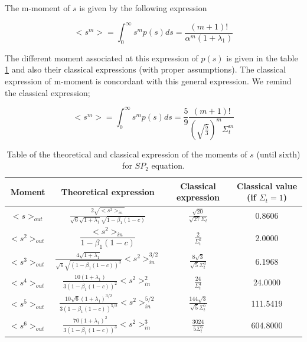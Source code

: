 \documentclass[a4paper, 12pt]{report}
\newcommand{\bl}{\big<}
\newcommand{\bg}{\big>}
\begin{document}
The m-moment of $s$ is given by the following expression

\begin{equation}
\bl s^m \bg = \int_0^\infty s^m p(s) ds = \frac{(m+1)!}{\alpha^m (1+\lambda_1)}
\end{equation}

The different moment associated at this expression of $p(s)$ is given in the table \ref{momentnsp2} and also their classical expressions (with proper assumptions). The classical expression of m-moment is concordant with this general expression. We remind the classical expression;

\begin{equation}
\bl s^m \bg = \int_0^\infty s^m p(s)ds =  \frac{5}{9}\frac{(m+1)!}{(\sqrt{\frac{5}{3}})^m \Sigma_t^m}
\end{equation}

\begin{center}
\begin{table}
\begin{center}
\begin{tabular}{|c|c|c|c|}
\hline
Moment & Theoretical expression & Classical expression & Classical value (if $\Sigma_t = 1$)  \\ \hline
$\bl s \bg_{out}$ &$ \frac{2\sqrt{\bl s^2 \bg_{in}}}{\sqrt{6}\sqrt{1+\lambda_1}\sqrt{1-\beta_1(1-c)}}$ &$ \frac{\sqrt{20}}{\sqrt{27}\Sigma_t}$ & 0.8606 \\ \hline
$\bl s^2 \bg_{out}$ & $\dfrac{\bl s^2 \bg_{in}}{1-\beta_1(1-c)}$& $\frac{2}{\Sigma_t^2}$ & 2.0000 \\ \hline
$\bl s^3 \bg_{out}$ &$ \frac{4\sqrt{1+\lambda_1}}{\sqrt{6}\sqrt{(1-\beta_1(1-c))^3}}{\bl s^2 \bg_{in}^{3/2}}$ &$ \frac{8\sqrt{3}}{\sqrt{5}\Sigma_t^3}$ & 6.1968\\ \hline
$\bl s^4 \bg_{out}$ &$ \frac{10(1+\lambda_1)}{3(1-\beta_1(1-c))^2}\bl s^2 \bg_{in}^2$&$ \frac{24}{ \Sigma_t^4}$ & 24.0000\\ \hline
$\bl s^5 \bg_{out}$ &$ \frac{10\sqrt{6}(1+\lambda_1)^{3/2}}{3(1-\beta_1(1-c))^{5/2}}\bl s^2 \bg_{in}^{5/2}$&$ \frac{144\sqrt{3}}{\sqrt{5}\Sigma_t^5}$ & 111.5419 \\ \hline
$\bl s^6 \bg_{out}$ &$ \frac{70(1+\lambda_1)^{2}}{3(1-\beta_1(1-c))^{3}}\bl s^2 \bg_{in}^3$ &$ \frac{3024}{5 \Sigma_t^6}$ & 604.8000 \\ \hline
\end{tabular}
\caption{\label{momentnsp2} Table of the theoretical and classical expression of the moments of $s$ (until sixth) for $SP_2$ equation. }
\end{center}
\end{table}
\end{center}
\end{document}
